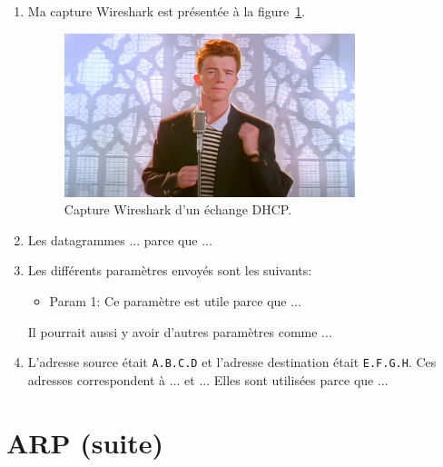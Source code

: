\documentclass[]{article}
\begin{document}
\begin{enumerate}
    \item Ma capture Wireshark est présentée à la figure~\ref{fig:wireshark-dhcp}.

    \begin{figure} 
        \centering
        \includegraphics[width=0.8\textwidth]{rickroll.jpg} %
        \caption[]{Capture Wireshark d'un échange DHCP.}
        \label{fig:wireshark-dhcp}
    \end{figure}

    \item Les datagrammes ... parce que ...

    \item Les différents paramètres envoyés sont les suivants:

    \begin{itemize}
        \item Param 1: Ce paramètre est utile parce que ...
    \end{itemize}

    Il pourrait aussi y avoir d'autres paramètres comme ...

    \item L'adresse source était \texttt{A.B.C.D} et l'adresse destination était
          \texttt{E.F.G.H}. Ces adresses correspondent à ... et ... Elles sont
          utilisées parce que ...

\end{enumerate}

\section*{ARP (suite)}
\end{document}

